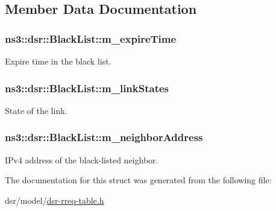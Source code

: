 \subsection{Member Data Documentation}
\subsubsection[{\texorpdfstring{m\+\_\+expire\+Time}{m_expireTime}}]{ ns3\+::dsr\+::\+Black\+List\+::m\+\_\+expire\+Time}\hypertarget{structns3_1_1dsr_1_1BlackList_a08aa777cde67ca34b34d7d4b0d8dd3de}{}\label{structns3_1_1dsr_1_1BlackList_a08aa777cde67ca34b34d7d4b0d8dd3de}


Expire time in the black list. 

\subsubsection[{\texorpdfstring{m\+\_\+link\+States}{m_linkStates}}]{ ns3\+::dsr\+::\+Black\+List\+::m\+\_\+link\+States}\hypertarget{structns3_1_1dsr_1_1BlackList_a32ff5b707885a62941a6f9381fb3daf3}{}\label{structns3_1_1dsr_1_1BlackList_a32ff5b707885a62941a6f9381fb3daf3}


State of the link. 

\subsubsection[{\texorpdfstring{m\+\_\+neighbor\+Address}{m_neighborAddress}}]{ ns3\+::dsr\+::\+Black\+List\+::m\+\_\+neighbor\+Address}\hypertarget{structns3_1_1dsr_1_1BlackList_ae21744867af10f1c0ad690ad9d58a420}{}\label{structns3_1_1dsr_1_1BlackList_ae21744867af10f1c0ad690ad9d58a420}


I\+Pv4 address of the black-\/listed neighbor. 



The documentation for this struct was generated from the following file\+:\begin{DoxyCompactItemize}
\item 
dsr/model/\hyperlink{dsr-rreq-table_8h}{dsr-\/rreq-\/table.\+h}\end{DoxyCompactItemize}

